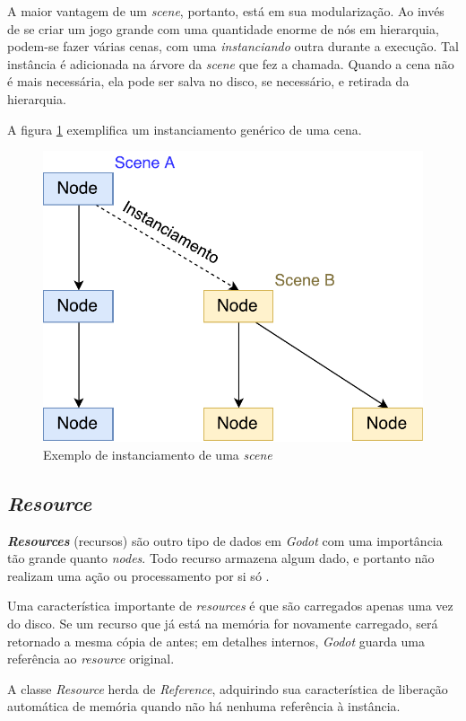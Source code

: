 A maior vantagem de um \textit{scene}, portanto, está em sua modularização. Ao invés de se criar um jogo grande com uma quantidade enorme de nós em hierarquia, podem-se fazer várias cenas, com uma \emph{instanciando} outra durante a execução. Tal instância é adicionada na árvore da \textit{scene} que fez a chamada. Quando a cena não é mais necessária, ela pode ser salva no disco, se necessário, e retirada da hierarquia.

A figura \ref{sceneInstance} exemplifica um instanciamento genérico de uma cena.

\begin{figure}[H]
  \centering
  \includegraphics[width=.5\textwidth]{image/scene.pdf}
  \caption{Exemplo de instanciamento de uma \textit{scene} \citep{godotScene}}
  \label{sceneInstance}
\end{figure}


\subsection{\textit{Resource}}

\textbf{\textit{Resources}} (recursos) são outro tipo de dados em \textit{Godot} com uma importância tão grande quanto \textit{nodes}. Todo recurso armazena algum dado, e portanto não realizam uma ação ou processamento por si só \citep{godotResource}.

Uma característica importante de \textit{resources} é que são carregados apenas uma vez do disco. Se um recurso que já está na memória for novamente carregado, será retornado a mesma cópia de antes; em detalhes internos, \textit{Godot} guarda uma referência ao \textit{resource} original.

A classe \textit{Resource} herda de \textit{Reference}, adquirindo sua característica de liberação automática de memória quando não há nenhuma referência à instância.

